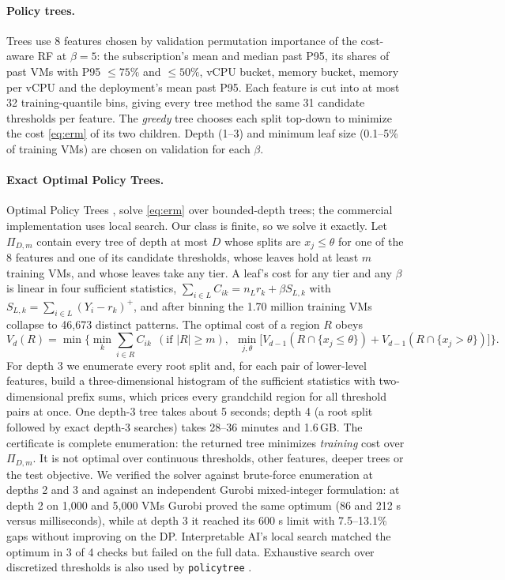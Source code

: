 \documentclass[10pt]{article}
\begin{document}
\paragraph{Policy trees.} Trees use 8 features chosen by validation permutation importance of the cost-aware RF at $\beta=5$: the subscription's mean and median past P95, its shares of past VMs with P95 $\le75\%$ and $\le50\%$, vCPU bucket, memory bucket, memory per vCPU and the deployment's mean past P95. Each feature is cut into at most 32 training-quantile bins, giving every tree method the same 31 candidate thresholds per feature. The \emph{greedy} tree chooses each split top-down to minimize the cost \eqref{eq:erm} of its two children. Depth (1--3) and minimum leaf size (0.1--5\% of training VMs) are chosen on validation for each $\beta$.

\paragraph{Exact Optimal Policy Trees.} Optimal Policy Trees \citep{amram2022opt}, \citep[Ch.~14]{bertsimas2019mlopt} solve \eqref{eq:erm} over bounded-depth trees; the commercial implementation uses local search. Our class is finite, so we solve it exactly. Let $\Pi_{D,m}$ contain every tree of depth at most $D$ whose splits are $x_j\le\theta$ for one of the 8 features and one of its candidate thresholds, whose leaves hold at least $m$ training VMs, and whose leaves take any tier. A leaf's cost for any tier and any $\beta$ is linear in four sufficient statistics, $\sum_{i\in L}C_{ik}=n_Lr_k+\beta S_{L,k}$ with $S_{L,k}=\sum_{i\in L}(Y_i-r_k)^+$, and after binning the 1.70 million training VMs collapse to 46,673 distinct patterns. The optimal cost of a region $R$ obeys
\begin{equation}
V_d(R)=\min\Big\{\textstyle\min_k \sum_{i\in R}C_{ik}\ \ (\text{if }|R|\ge m),\ \ \min_{j,\theta}\big[V_{d-1}(R\cap\{x_j\le\theta\})+V_{d-1}(R\cap\{x_j>\theta\})\big]\Big\}.
\label{eq:dp}
\end{equation}
For depth 3 we enumerate every root split and, for each pair of lower-level features, build a three-dimensional histogram of the sufficient statistics with two-dimensional prefix sums, which prices every grandchild region for all threshold pairs at once. One depth-3 tree takes about 5 seconds; depth 4 (a root split followed by exact depth-3 searches) takes 28--36 minutes and 1.6\,GB. The certificate is complete enumeration: the returned tree minimizes \emph{training} cost over $\Pi_{D,m}$. It is not optimal over continuous thresholds, other features, deeper trees or the test objective. We verified the solver against brute-force enumeration at depths 2 and 3 and against an independent Gurobi mixed-integer formulation: at depth 2 on 1,000 and 5,000 VMs Gurobi proved the same optimum (86 and 212 s versus milliseconds), while at depth 3 it reached its 600 s limit with 7.5--13.1\% gaps without improving on the DP. Interpretable AI's local search \citep{iai} matched the optimum in 3 of 4 checks but failed on the full data. Exhaustive search over discretized thresholds is also used by \texttt{policytree} \citep{sverdrup2020policytree,zhou2023offline}.
\end{document}
